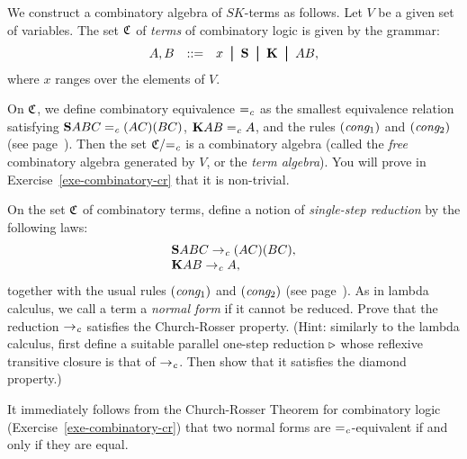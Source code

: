 \documentclass{article}
\begin{document}
\begin{example}\label{exa-sk-term-alg}
  We construct a combinatory algebra of $SK$-terms as follows.  Let
  $V$ be a given set of variables. The set ${\mathfrak C}$ of {\em terms}
  of combinatory logic is given by the grammar:
  \[   \begin{array}{lll}
    A,B &\bnf& x\bor \S\bor \K\bor AB,
  \end{array}
  \]
  where $x$ ranges over the elements of $V$.
  
  On ${\mathfrak C}$, we define combinatory equivalence $=_{\it c}$ as the
  smallest equivalence relation satisfying ${\bf S} ABC =_{\it c} (AC)(BC)$, ${\bf K}
  AB =_{\it c} A$, and the rules $\textrm{(\textit{cong$_1$\/})}$ and $\textrm{(\textit{cong$_2$\/})}$
  (see page~\pageref{page-def-beta}). Then the set ${\mathfrak C}/{=_{\it c}}$ is a
  combinatory algebra (called the {\em free} combinatory algebra
  generated by $V$, or the {\em term algebra}). You will prove in
  Exercise~\ref{exe-combinatory-cr} that it is non-trivial.
\end{example}


\begin{exercise}\label{exe-combinatory-cr}
  On the set ${\mathfrak C}$ of combinatory terms, define a notion of {\em
    single-step reduction} by the following laws:
  \[ \begin{array}{l}
    {\bf S} ABC \rightarrow_{\it c} (AC)(BC), \\
    {\bf K} AB \rightarrow_{\it c} A,\\
  \end{array}
  \]
  together with the usual rules $\textrm{(\textit{cong$_1$\/})}$ and
  $\textrm{(\textit{cong$_2$\/})}$ (see page~\pageref{page-def-beta}). As in lambda
  calculus, we call a term a {\em normal form} if it cannot be
  reduced. Prove that the reduction $\rightarrow_{\it c}$ satisfies the
  Church-Rosser property. (Hint: similarly to the lambda calculus,
  first define a suitable parallel one-step reduction $\mathrel{\triangleright}$ whose
  reflexive transitive closure is that of $\rightarrow_{\it c}$. Then show that it
  satisfies the diamond property.)
\end{exercise}

\begin{corollary}\label{cor-sk-nf}
  It immediately follows from the Church-Rosser Theorem for
  combinatory logic (Exercise~\ref{exe-combinatory-cr}) that two
  normal forms are $=_{\it c}$-equivalent if and only if they are equal.
\end{corollary}
\end{document}
